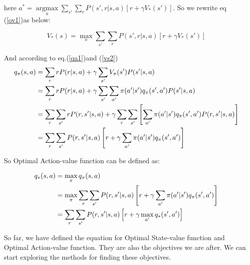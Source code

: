     here $a^*= \mathop{\arg \max}\limits_{a}\sum_{s'}\sum_{r}P(s',r|s,a)[r+\gamma V_*(s')]$. So we rewrite eq (\ref{ov1})as below:

    \begin{equation}\label{ov2}
        V_*(s) = \max_{a}\sum_{s'}\sum_{r}P(s',r|s,a)[r+\gamma V_{*}(s')] 
    \end{equation}

    And according to eq.(\ref{qa1})and (\ref{vs2})
    \begin{align}
        q_{\pi}(s,a) & = \sum_rrP(r|s,a) + \gamma \sum_{s'}V_{\pi}(s')P(s'|s,a) \notag \\
                     & = \sum_rrP(r|s,a) + \gamma \sum_{s'}\sum_{a'}\pi (a'|s') q_{\pi}(s',a')P(s'|s,a) \notag \\
                     & = \sum_r\sum_{s'}rP(r,s'|s,a) + \gamma \sum_{r}\sum_{s'}\left [\sum_{a'}\pi
                    (a'|s')q_{\pi}(s',a')P(r,s'|s,a)\right ] \notag \\
                    & = \sum_r\sum_{s'}P(r,s'|s,a)\left [r+\gamma \sum_{a'}\pi (a'|s')q_{\pi}(s',a')\right ]
    \end{align}

    So Optimal Action-value function can be defined as:

    \begin{definition}
        \begin{align}\label{oq1}
            q_*(s,a) & = \max_{\pi}q_{\pi}(s,a) \notag \\
                     & = \max_{\pi}\sum_r\sum_{s'}P(r,s'|s,a)\left [r+\gamma \sum_{a'}\pi (a'|s')q_{\pi}(s',a')\right ] \notag \\
                     & = \sum_r\sum_{s'}P(r,s'|s,a)\left [r+\gamma \max_{a'}q_*(s',a')\right ]
        \end{align}       
    \end{definition}
    
    So far, we have defined the equation for Optimal State-value function and Optimal Action-value function. They are also the objectives we are after. We can start exploring the methods for finding these objectives.
     